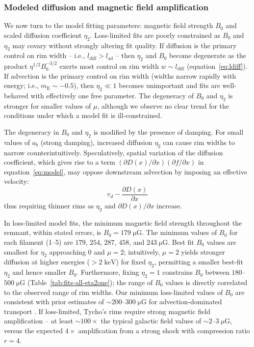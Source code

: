 \documentclass[iop, apj, numberedappendix]{emulateapj}
\newcommand*{\mt}{\mathrm}
\newcommand*{\unit}[1]{\;\mt{#1}}  %
\newcommand*{\abt}{\mathord{\sim}} %
\newcommand*{\ptl}{\partial}
\newcommand*{\mE}{m_\mt{E}}
\newcommand*{\muG}{\unit{\mu G}}
\begin{document}
\subsubsection{Modeled diffusion and magnetic field amplification}

We now turn to the model fitting parameters: magnetic field strength $B_0$ and
scaled diffusion coefficient $\eta_2$.  Loss-limited fits are poorly
constrained as $B_0$ and $\eta_2$ may covary without strongly altering fit
quality.  If diffusion is the primary control on rim width -- i.e.,
$l_{\mt{diff}} > l_{\mt{ad}}$ -- then $\eta_2$ and $B_0$ become degenerate as
the product $\eta^{1/2} B_0^{-3/2}$ exerts most control on rim width $w \sim
l_{\mt{diff}}$ (equation~\eqref{eq:ldiff}).  If advection is the primary
control on rim width (widths narrow rapidly with energy; i.e., $\mE \sim
-0.5$), then $\eta_2 \ll 1$ becomes unimportant and fits are well-behaved with
effectively one free parameter.  The degeneracy of $B_0$ and $\eta_2$ is
stronger for smaller values of $\mu$, although we observe no clear trend for
the conditions under which a model fit is ill-constrained.

The degeneracy in $B_0$ and $\eta_2$ is modified by the presence of damping.
For small values of $a_b$ (strong damping), increased diffusion $\eta_2$ can
cause rim widths to narrow counterintuitively.  Speculatively, spatial
variation of the diffusion coefficient, which gives rise to a term $(\ptl D(x)
/ \ptl x) (\ptl f/\ptl x)$ in equation~\eqref{eq:model}, may oppose downstream
advection by imposing an effective velocity:
\begin{equation}
    v_d - \frac{\ptl D(x)}{\ptl x}
\end{equation}
thus requiring thinner rims as $\eta_2$ and $\ptl D(x) / \ptl x$ increase.

In loss-limited model fits, the minimum magnetic field strength throughout the
remnant, within stated errors, is $B_0 = 179 \muG$.  The minimum values of
$B_0$ for each filament (1--5) are $179$, $254$, $287$, $458$, and $243 \muG$.
Best fit $B_0$ values are smallest for $\eta_2$ approaching $0$ and $\mu =
2$; intuitively, $\mu = 2$ yields stronger diffusion at higher energies
($>2\unit{keV}$) for fixed $\eta_2$, permitting a smaller best-fit $\eta_2$ and
hence smaller $B_0$.  Furthermore, fixing $\eta_2 = 1$ constrains $B_0$ between
$180$--$500 \muG$ (Table~\ref{tab:fits-all-eta2one}); the range of $B_0$ values
is directly correlated to the observed range of rim widths.  Our minimum
loss-limited values of $B_0$ are consistent with prior estimates of $\abt
200$--$300 \muG$ for advection-dominated transport \citep{volk2005,
parizot2006, morlino2012}.  If loss-limited, Tycho's rims require strong
magnetic field amplification -- at least $\abt 100\times$ the typical galactic
field values of $\abt 2$--$3 \muG$, versus the expected $4\times$ amplification
from a strong shock with compression ratio $r=4$.
\end{document}
